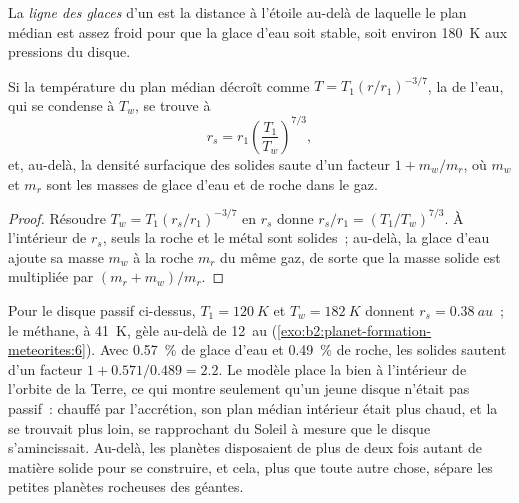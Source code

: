 \begin{definition}\label{def:b2:planet-formation-meteorites:snow-line}
La \emph{ligne des glaces} d'un  est la distance à
l'étoile au-delà de laquelle le plan médian est assez froid pour que la glace d'eau soit stable, soit
environ \qty{180}{K} aux pressions du disque.
\end{definition}

\begin{proposition}
\label{prop:b2:planet-formation-meteorites:snow-line}
Si la température du plan médian décroît comme $T = T_1 (r/r_1)^{-3/7}$, la  de l'eau,
qui se condense à $T_w$, se trouve à
\[
  r_s = r_1 \left(\frac{T_1}{T_w}\right)^{7/3},
\]
et, au-delà, la densité surfacique des solides saute d'un facteur $1 + m_w/m_r$, où $m_w$ et $m_r$ sont les masses de
glace d'eau et de roche dans le gaz.
\end{proposition}

\begin{proof}
Résoudre $T_w = T_1 (r_s/r_1)^{-3/7}$ en $r_s$ donne $r_s/r_1 = (T_1/T_w)^{7/3}$. À
l'intérieur de $r_s$, seuls la roche et le métal sont solides~; au-delà, la glace d'eau
ajoute sa masse $m_w$ à la roche $m_r$ du même gaz, de sorte que la masse solide est
multipliée par $(m_r + m_w)/m_r$.
\end{proof}

Pour le disque passif ci-dessus, $T_1 = \qty{120}{K}$ et $T_w = \qty{182}{K}$ donnent
$r_s = \qty{0.38}{au}$~; le méthane, à \qty{41}{K}, gèle au-delà de \qty{12}{au}
(\cref{exo:b2:planet-formation-meteorites:6}). Avec \qty{0.57}{\percent} de glace d'eau et
\qty{0.49}{\percent} de roche, les solides sautent d'un facteur $1 + 0.571/0.489 = 2.2$. Le
modèle place la  bien à l'intérieur de l'orbite de la Terre, ce qui montre
seulement qu'un jeune disque n'était pas passif~: chauffé par l'accrétion, son plan médian
intérieur était plus chaud, et la  se trouvait plus loin, se rapprochant du
Soleil à mesure que le disque s'amincissait. Au-delà, les planètes disposaient de plus de deux
fois autant de matière solide pour se construire, et cela, plus que toute autre chose, sépare
les petites planètes rocheuses des géantes.

